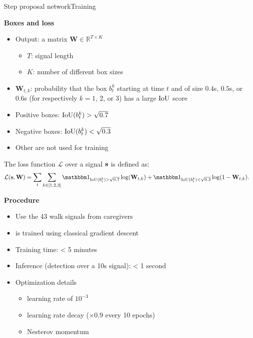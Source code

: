 \begin{frame}{Step proposal network}{Training}

\begin{minipage}[t]{0.49\linewidth}\vspace{0pt}
\centering\textbf{Boxes and loss}
\begin{itemize}
    \item Output: a matrix $\mathbf{W} \in \mathbb{R}^{T \times K}$
    \begin{itemize}
        \item $T$: signal length
        \item $K$: number of different box sizes
    \end{itemize}

    \item $\mathbf{W}_{t,k}$: probability that the box $b_t^k$ starting at time $t$ and of size $0.4$s, $0.5$s, or $0.6$s (for respectively $k=1$, $2$, or $3$) has a large $\mathrm{IoU}$ score
    \item Positive boxes: $\mathrm{IoU}(b_t^{k}) > \sqrt{0.7}$
    \item Negative boxes: $\mathrm{IoU}(b_t^{k}) < \sqrt{0.3}$
    \item Other are not used for training
\end{itemize}

\vspace{0.1cm}

The loss function $\mathcal{L}$ over a signal $\mathbf{s}$ is defined as:
\begin{equation*}\label{eq: loss training CNN}
\mathcal{L}(\bfs, \mathbf{W}) = \sum_{t} \sum_{k \in \left[1, 2, 3 \right]} \bbmind_{ \iou(b_t^{k})> \sqrt{0.7} } \log(\mathbf{W}_{t,k}) + \bbmind_{ \iou(b_t^{k})< \sqrt{0.3} } \log(1-\mathbf{W}_{t,k}). 
\end{equation*}

\end{minipage}\hfill
\begin{minipage}[t]{0.49\linewidth}\vspace{0pt}
\centering\textbf{Procedure}
    \begin{itemize}
        \item Use the 43 walk signals from caregivers
        \item \subalgo is trained using classical gradient descent
        \item Training time: < 5 minutes
        \item Inference (detection over a 10s signal): < 1 second
        \item Optimization details
        \begin{itemize}
            \item learning rate of $10^{-3}$
            \item learning rate decay ($\times 0.9$ every 10 epochs)
            \item Nesterov momentum
        \end{itemize}
    \end{itemize}
\end{minipage}

\end{frame}


